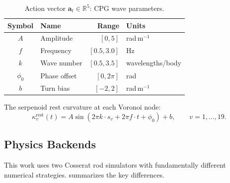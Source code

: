 \documentclass[11pt]{article}
\begin{document}
\begin{table}[H]
  \centering
  \small
  \caption{Action vector $\mathbf{a}_t \in \mathbb{R}^{5}$: CPG wave parameters.}
  \label{tab:action-vector}
  \begin{tabular}{clrl}
    \toprule
    Symbol & Name & Range & Units \\
    \midrule
    $A$      & Amplitude    & $[0, 5]$      & rad\,m$^{-1}$ \\
    $f$      & Frequency    & $[0.5, 3.0]$  & Hz \\
    $k$      & Wave number  & $[0.5, 3.5]$  & wavelengths/body \\
    $\phi_0$ & Phase offset & $[0, 2\pi]$   & rad \\
    $b$      & Turn bias    & $[-2, 2]$     & rad\,m$^{-1}$ \\
    \bottomrule
  \end{tabular}
\end{table}

\noindent
The serpenoid rest curvature at each Voronoi node:
\begin{equation}
  \kappa_v^{\text{rest}}(t) = A \sin(2\pi k \cdot s_v + 2\pi f \cdot t + \phi_0) + b, \qquad v = 1, \ldots, 19.
  \label{eq:serpenoid}
\end{equation}

\subsection{Physics Backends}
\label{sec:system:backends}

This work uses two Cosserat rod simulators with fundamentally different numerical strategies.
 summarizes the key differences.
\end{document}
